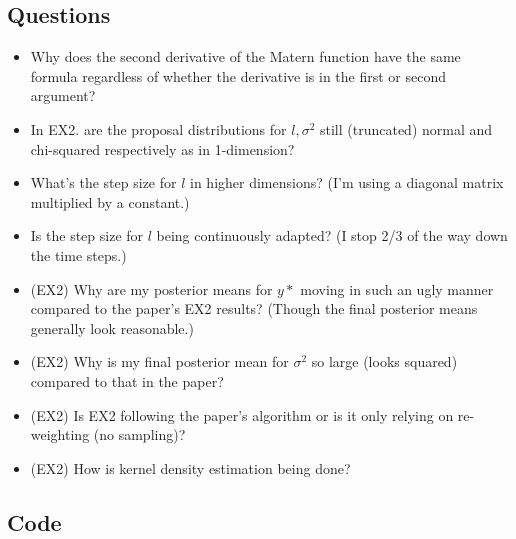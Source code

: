 \documentclass{sfuthesis}
\begin{document}

\section{Questions}

\begin{itemize}
\item Why does the second derivative of the Matern function have the same formula regardless of whether the derivative is in the first or second argument?
\item In EX2. are the proposal distributions for $l, \sigma^2$ still (truncated) normal and chi-squared respectively as in 1-dimension?
\item What's the step size for $l$ in higher dimensions? (I'm using a diagonal matrix multiplied by a constant.)
\item Is the step size for $l$ being continuously adapted? (I stop 2/3 of the way down the time steps.)
\item (EX2) Why are my posterior means for $y*$ moving in such an ugly manner compared to the paper's EX2 results? (Though the final posterior means generally look reasonable.)
\item (EX2) Why is my final posterior mean for $\sigma^2$ so large (looks squared) compared to that in the paper?
\item (EX2) Is EX2 following the paper's algorithm or is it only relying on re-weighting (no sampling)? 
\item (EX2) How is kernel density estimation being done?

\end{itemize}

%
%
%
%
%

\backmatter%
	
	

\begin{appendices} %
	\chapter{Code}
\end{appendices}
\end{document}
